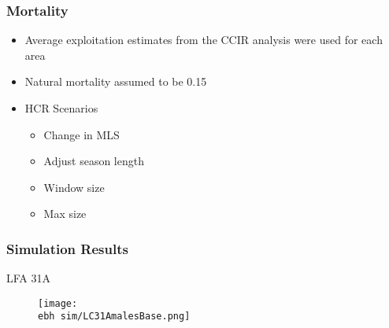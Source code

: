 \documentclass{beamer}
\newcommand{\ebh}{\string~/bio.data/bio.lobster/figures/LFA2733Framework2018/} %
\begin{document}
\begin{frame}
\frametitle{Mortality}
\begin{itemize}
\item Average exploitation estimates from the CCIR analysis were used for each area
\item Natural mortality assumed to be 0.15



\item HCR Scenarios
\begin{itemize}
\item Change in MLS
\item Adjust season length
\item Window size
\item Max size
\end{itemize}

\end{itemize}
\end{frame}



\begin{frame}
\frametitle{Simulation Results}
LFA 31A 
\begin{figure}
        \begin{center}
            \texttt{[image: \\ebh sim/LC31AmalesBase.png]}
        \end{center}
    \end{figure}
\end{frame}
\end{document}
